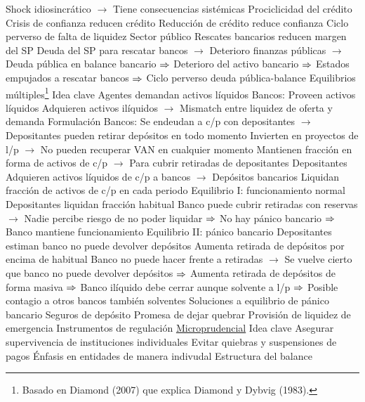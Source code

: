 \documentclass{nuevotema}
\begin{document}
\begin{esquemal}
				\4 Shock idiosincrático
				\4[] $\to$ Tiene consecuencias sistémicas
			\3 Prociclicidad del crédito
				\4 Crisis de confianza reducen crédito
				\4 Reducción de crédito reduce confianza
				\4[$\then$] Ciclo perverso de falta de liquidez
			\3 Sector público
				\4 Rescates bancarios reducen margen del SP
				\4 Deuda del SP para rescatar bancos
				\4[] $\to$ Deterioro finanzas públicas
				\4[] $\to$ Deuda pública en balance bancario
				\4[] $\then$ Deterioro del activo bancario
				\4[] $\then$ Estados empujados a rescatar bancos
				\4[] $\then$ Ciclo perverso deuda pública-balance
		\2 Equilibrios múltiples\footnote{Basado en Diamond (2007) que explica Diamond y Dybvig (1983).}
			\3 Idea clave
				\4 Agentes demandan activos líquidos
				\4 Bancos:
				\4[] Proveen activos líquidos
				\4[] Adquieren activos ilíquidos
				\4[] $\to$ Mismatch entre liquidez de oferta y demanda
			\3 Formulación
				\4 Bancos:
				\4[] Se endeudan a c/p con depositantes
				\4[] $\to$ Depositantes pueden retirar depósitos en todo momento
				\4[] Invierten en proyectos de l/p
				\4[] $\to$ No pueden recuperar VAN en cualquier momento
				\4[] Mantienen fracción en forma de activos de c/p
				\4[] $\to$ Para cubrir retiradas de depositantes
				\4 Depositantes
				\4[] Adquieren activos líquidos de c/p a bancos
				\4[] $\to$ Depósitos bancarios
				\4[] Liquidan fracción de activos de c/p en cada periodo
				\4 Equilibrio I: funcionamiento normal
				\4[] Depositantes liquidan fracción habitual
				\4[] Banco puede cubrir retiradas con reservas
				\4[] $\to$ Nadie percibe riesgo de no poder liquidar
				\4[] $\then$ No hay pánico bancario
				\4[] $\then$ Banco mantiene funcionamiento
				\4 Equilibrio II: pánico bancario
				\4[] Depositantes estiman banco no puede devolver depósitos
				\4[] Aumenta retirada de depósitos por encima de habitual
				\4[] Banco no puede hacer frente a retiradas
				\4[] $\to$ Se vuelve cierto que banco no puede devolver depósitos
				\4[] $\then$ Aumenta retirada de depósitos de forma masiva
				\4[] $\then$ Banco ilíquido debe cerrar aunque solvente a l/p
				\4[] $\then$ Posible contagio a otros bancos también solventes
			\3 Soluciones a equilibrio de pánico bancario
				\4 Seguros de depósito
				\4 Promesa de dejar quebrar
				\4 Provisión de liquidez de emergencia
		\2 Instrumentos de regulación
			\3 \underline{Microprudencial}
			\3 Idea clave
				\4 Asegurar supervivencia de instituciones individuales
				\4 Evitar quiebras y suspensiones de pagos
				\4 Énfasis en entidades de manera indivudal
			\3 Estructura del balance

\end{esquemal}
\end{document}
